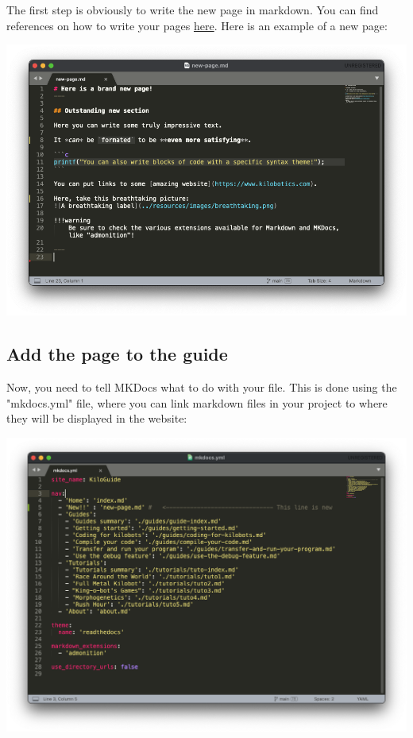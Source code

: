 \documentclass[a4paper,12pt,titlepage]{scrartcl}
\begin{document}
The first step is obviously to write the new page in markdown. You can find references on how to write your pages \href{https://www.mkdocs.org/user-guide/writing-your-docs/#writing-with-markdown}{here}. Here is an example of a new page:

\begin{center}
    \includegraphics[scale=0.45]{new-page-md.png}
\end{center}

\subsection{Add the page to the guide}

Now, you need to tell MKDocs what to do with your file. This is done using the "mkdocs.yml" file, where you can link markdown files in your project to where they will be displayed in the website:

\begin{center}
    \includegraphics[scale=0.4]{new-config.png}
\end{center}
\end{document}

